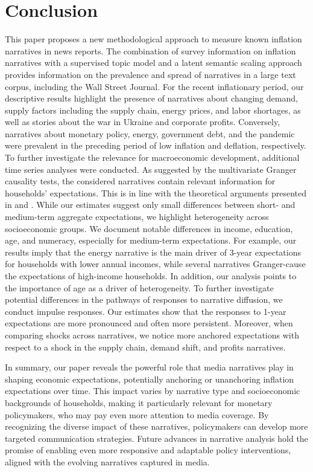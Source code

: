 \section{Conclusion}\label{sec:Conclusion}


This paper proposes a new methodological approach to measure known inflation narratives in news reports. The combination of survey information on inflation narratives with a supervised topic model and a latent semantic scaling approach provides information on the prevalence and spread of narratives in a large text corpus, including the Wall Street Journal. For the recent inflationary period, our descriptive results highlight the presence of narratives about changing demand, supply factors including the supply chain, energy prices, and labor shortages, as well as stories about the war in Ukraine and corporate profits. Conversely, narratives about monetary policy, energy, government debt, and the pandemic were prevalent in the preceding period of low inflation and deflation, respectively. To further investigate the relevance for macroeconomic development, additional time series analyses were conducted. As suggested by the multivariate Granger causality tests, the considered narratives contain relevant information for households' expectations. This is in line with the theoretical arguments presented in \cite{Shiller.2017, Tuckett.2020} and \cite{Beckert.2016}. While our estimates suggest only small differences between short- and medium-term aggregate expectations, we highlight heterogeneity across socioeconomic groups. We document notable differences in income, education, age, and numeracy, especially for medium-term expectations. For example, our results imply that the energy narrative is the main driver of 3-year expectations for households with lower annual incomes, while several narratives Granger-cause the expectations of high-income households. In addition, our analysis points to the importance of age as a driver of heterogeneity. To further investigate potential differences in the pathways of responses to narrative diffusion, we conduct impulse responses. Our estimates show that the responses to 1-year expectations are more pronounced and often more persistent. Moreover, when comparing shocks across narratives, we notice more anchored expectations with respect to a shock in the supply chain, demand shift, and profits narratives.

In summary, our paper reveals the powerful role  that media narratives play in shaping economic expectations, potentially anchoring or unanchoring inflation expectations over time. This impact varies by narrative type and socioeconomic backgrounds of households, making it  particularly relevant for monetary policymakers, who may pay even more attention to media coverage. By recognizing the diverse impact of these narratives, policymakers can develop more targeted communication strategies. Future advances in narrative analysis hold the promise of enabling even more responsive and adaptable policy interventions, aligned with the evolving narratives captured in media.